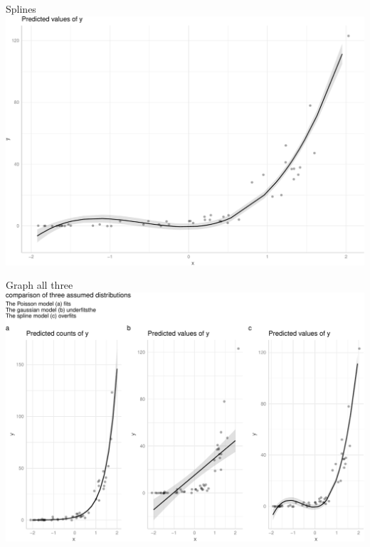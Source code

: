 \documentclass[
  ignorenonframetext,
]{beamer}
\begin{document}
\begin{frame}{Splines}
\protect\hypertarget{splines}{}
\includegraphics{slides_files/figure-beamer/unnamed-chunk-37-1.pdf}

\begin{block}{Graph all three}
\protect\hypertarget{graph-all-three}{}
\includegraphics{slides_files/figure-beamer/unnamed-chunk-38-1.pdf}
\end{block}


\end{frame}
\end{document}
